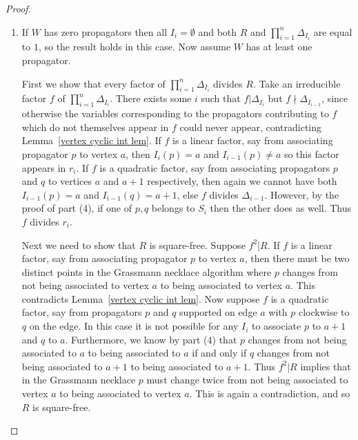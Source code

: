 \documentclass[11pt]{article}
\newcommand{\note}{\todo[color=green!40]}
\theoremstyle{remark}
\theoremstyle{definition}
\begin{document}
\begin{proof}
\begin{enumerate}

\item If $W$ has zero propagators then all $I_i=\emptyset$ and both $R$ and $\prod_{i=1}^n \Delta_{I_i}$ are equal to $1$, so the result holds in this case.  Now assume $W$ has at least one propagator.

First we show that every factor of $\prod_{i=1}^n \Delta_{I_i}$ divides $R$.  Take an irreducible factor $f$ of $\prod_{i=1}^n \Delta_{I_i}$. There exists some $i$ such that $f|\Delta_{I_i}$ but $f\!\!\nmid\!\! \Delta_{I_{i-1}}$, since otherwise the variables corresponding to the propagators contributing to $f$ which do not themselves appear in $f$ could never appear, contradicting Lemma~\ref{vertex cyclic int lem}.  If $f$ is a linear factor, say from associating propagator $p$ to vertex $a$, then $I_{i}(p)=a$ and $I_{i-1}(p)\neq a$ so this factor appears in $r_i$.  If $f$ is a quadratic factor, say from associating propagators $p$ and $q$ to vertices $a$ and $a+1$ respectively, then again we cannot have both $I_{i-1}(p) = a$ and $I_{i-1}(q) = a+1$, else $f$ divides $\Delta_{i-1}$. However, by the proof of part (4), if one of $p,q$ belongs to $S_i$ then the other does as well.  Thus $f$ divides $r_i$.

Next we need to show that $R$ is square-free.  Suppose $f^2|R$.  If $f$ is a linear factor, say from associating propagator $p$ to vertex $a$, then there must be two distinct points in the Grassmann necklace algorithm where $p$ changes from not being associated to vertex $a$ to being associated to vertex $a$.  This contradicts Lemma~\ref{vertex cyclic int lem}.  Now suppose $f$ is a quadratic factor, say from propagators $p$ and $q$ supported on edge $a$ with $p$ clockwise to $q$ on the edge.  In this case it is not possible for any $I_i$ to associate $p$ to $a+1$ and $q$ to $a$.  Furthermore, we know by part (4) that $p$ changes from not being associated to $a$ to being associated to $a$ if and only if $q$ changes from not being associated to $a+1$ to being associated to $a+1$.  Thus $f^2|R$ implies that  in the Grassmann necklace $p$ must change twice from not being associated to vertex $a$ to being associated to vertex $a$. This is again a contradiction, and so $R$ is square-free.


\end{enumerate}
\end{proof}
\end{document}
